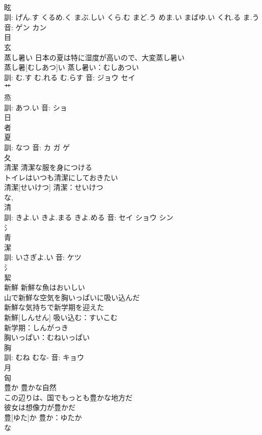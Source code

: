\documentclass[8pt]{extreport}
\begin{document}
\begin{CJK}{UTF8}{min}
\\	眩 
\\	訓: げん.す くるめ.く まぶ.しい くら.む まど.う めま.い まばゆ.い くれ.る ま.う 音: ゲン カン 
\\	目 
\\	玄 
\\	蒸し暑い	日本の夏は特に湿度が高いので、大変蒸し暑い 
\\	蒸し暑[むしあつ]い			蒸し暑い：むしあつい
\\	訓: む.す む.れる む.らす 音: ジョウ セイ 
\\	艹 
\\	烝 
\\	訓: あつ.い 音: ショ 
\\	日 
\\	者 
\\	夏 
\\	訓: なつ 音: カ ガ ゲ 
\\	夂 
\\	清潔	清潔な服を身につける 
\\	トイレはいつも清潔にしておきたい 
\\	清潔[せいけつ]			清潔：せいけつ
\\	な, 
\\	清 
\\	訓: きよ.い きよ.まる きよ.める 音: セイ ショウ シン 
\\	氵 
\\	青 
\\	潔 
\\	訓: いさぎよ.い 音: ケツ 
\\	氵 
\\	絜 
\\	新鮮	新鮮な魚はおいしい 
\\	山で新鮮な空気を胸いっぱいに吸い込んだ 
\\	新鮮な気持ちで新学期を迎えた 
\\	新鮮[しんせん]			吸い込む：すいこむ
\\	新学期：しんがっき
\\	胸いっぱい：むねいっぱい
\\	胸 
\\	訓: むね むな- 音: キョウ 
\\	月 
\\	匈 
\\	豊か	豊かな自然 
\\	この辺りは、国でもっとも豊かな地方だ 
\\	彼女は想像力が豊かだ 
\\	豊[ゆた]か			豊か：ゆたか
\\	な 

\end{CJK}
\end{document}
